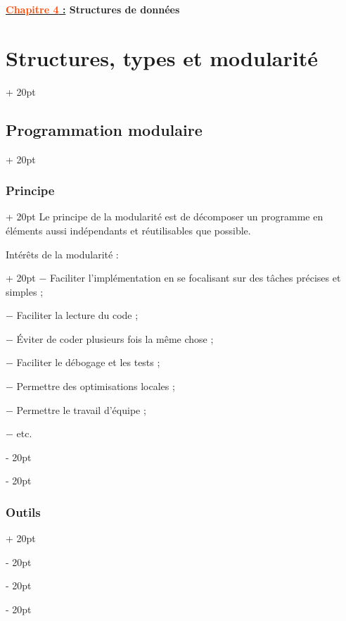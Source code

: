 \documentclass[a4paper, 12pt, twoside]{article}
\renewcommand{\emph}{\textcolor{ff4500}}
\newcommand{\ind}[1][20pt]{\advance\leftskip + #1}
\newcommand{\deind}[1][20pt]{\advance\leftskip - #1}
\newenvironment{indt}[2][20pt]{#2 \par \ind[#1]}{\par \deind} %
\newcommand{\thetitle}[2]{\begin{center}\textbf{{\LARGE \underline{\emph{#1} :}} {\Large #2}}\end{center}}
\begin{document}
    \thetitle{Chapitre 4}{Structures de données}
    
    
    \tableofcontents
    
    \newpage
    
    
    \begin{indt}{\section{Structures, types et modularité}}
        
        \begin{indt}{\subsection{Programmation modulaire}}
            
            \begin{indt}{\subsubsection{Principe}}
                Le principe de la modularité est de décomposer un programme en éléments aussi indépendants et réutilisables que possible.
                
                \begin{indt}{Intérêts de la modularité :}
                    $-$ Faciliter l’implémentation en se focalisant sur des tâches précises et simples ;
                    
                    $-$ Faciliter la lecture du code ;
                    
                    $-$ \'Eviter de coder plusieurs fois la même chose ;
                    
                    $-$ Faciliter le débogage et les tests ;
                    
                    $-$ Permettre des optimisations locales ;
                    
                    $-$ Permettre le travail d’équipe ;
                    
                    $-$ etc.
                \end{indt}
            \end{indt}
            
            \begin{indt}{\subsubsection{Outils}}
                

\end{indt}
\end{indt}
\end{indt}
\end{document}
